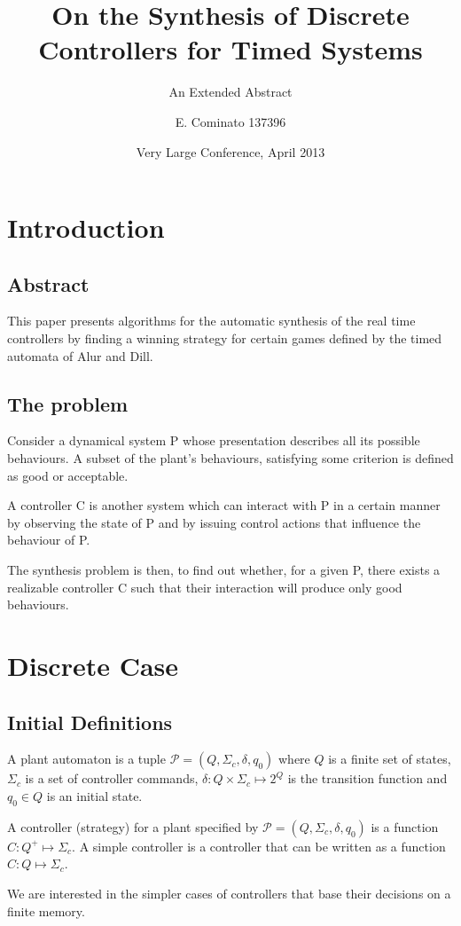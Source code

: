 \documentclass[table]{beamer}
\title[Automatic Verification] %
{On the Synthesis of Discrete Controllers for Timed Systems}
\subtitle{An Extended Abstract}
\author[Enrico] %
{E. Cominato 137396\inst{1}}
\institute %
{
	\inst{1}%
	Dipartimento di Scienze Matematiche, Informatiche e Fisiche\\
	Università degli studi di Udine
}
\date[VLC 2013] %
{Very Large Conference, April 2013}
\newcommand{\Plant}{\ensuremath{\mathcal{P}=(Q,\Sigma_c,\delta, q_0)}}
\newcommand{\Controller}{\ensuremath{C:Q^+\longmapsto \Sigma_c}}
\begin{document}
\frame{\titlepage}

\section{Introduction}
\subsection{Abstract}
\begin{frame}
This paper presents algorithms for the automatic synthesis of the real time controllers by finding a winning strategy for certain games defined by the timed automata of Alur and Dill.
\end{frame}

\subsection{The problem}
\begin{frame}
Consider a dynamical system P whose presentation describes all its possible behaviours.
A subset of the plant's behaviours, satisfying some criterion is defined as good or acceptable.

\medskip

A controller C is another system which can interact with P in a certain manner by observing the state of P and by issuing control actions that influence the behaviour of P.
\end{frame}

\begin{frame}
The synthesis problem is then, to find out whether, for a given P, there exists a realizable controller C
such that their interaction will produce only good behaviours.
\end{frame}

\section{Discrete Case}
\subsection{Initial Definitions}
\begin{frame}
	\begin{dfn}[Plant]
		A plant automaton is a tuple $\Plant$ where
		$Q$ is a finite set of states, $\Sigma_c$ is a set of controller commands, 
		$\delta:Q \times \Sigma_c \longmapsto 2^Q$ is the transition function and 
		$q_0 \in Q$ is an initial state.
	\end{dfn}

	\begin{dfn}[Controllers]
		A controller (strategy) for a plant specified by $\Plant$ 
		is a function $\Controller$. A simple controller is a controller that 
		can be written as a function $C:Q \longmapsto \Sigma_c$.
	\end{dfn}
	We are interested in the simpler cases of controllers that base their decisions on a finite memory.
\end{frame}
\end{document}
